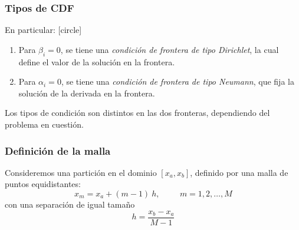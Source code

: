 \begin{frame}
\frametitle{Tipos de CDF}
En particular:
[circle]
\begin{enumerate}[<+->]
\item Para $\beta_{i} = 0$, se tiene una \emph{condición de frontera de tipo Dirichlet}, la cual define el valor de la solución en la frontera.
\item Para $\alpha_{i} = 0$, se tiene una \emph{condición de frontera de tipo Neumann}, que fija la solución de la derivada en la frontera.
\end{enumerate}
\pause
Los tipos de condición son distintos en las dos fronteras, dependiendo del problema en cuestión.
\end{frame}
\begin{frame}
\frametitle{Definición de la malla}
Consideremos una partición en el dominio $[x_{a}, x_{b}]$, definido por una malla de puntos equidistantes:
\begin{equation}
x_{m} = x_{a} + (m - 1) \: h, \hspace{1cm} m = 1, 2, \ldots, M
\label{eq:ecuacion_12_95}
\end{equation}
con una separación de igual tamaño
\begin{equation}
h = \dfrac{x_{b} - x_{a}}{M - 1}
\end{equation}
\label{eq:ecuacion_12_96}
\end{frame}
